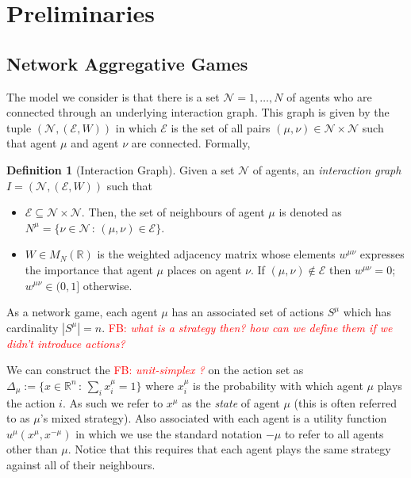 \documentclass{article}
\theoremstyle{definition}
\newtheorem*{definition}{Definition}
\newcommand{\fb}[1]{\textcolor{red}{FB: \textit{#1}}}
\newcommand{\agentset}{\mathcal{N}}
\newcommand{\edgeset}{\mathcal{E}}
\newcommand{\weightset}{W}
\newcommand{\actionset}[1]{S^{#1}}
\newcommand{\wmunu}{w^{\mu \nu}}
\newcommand{\xmu}{x^{\mu}}
\newcommand{\xnotmu}{x^{-\mu}}
\newcommand{\xmuaction}[1]{x^{\mu}_{#1}}
\begin{document}
		\section{Preliminaries}
	\subsection{Network Aggregative Games}
	\label{sec::NAG}

	The model we consider is that there is a set $\agentset = {1,
         \ldots , N}$ of agents who are connected through an underlying
        interaction graph. This graph is given by the tuple
        $(\agentset, (\edgeset, \weightset))$ in which $\edgeset$ is
        the set of all pairs $(\mu, \nu) \in \agentset \times
        \agentset$ such that agent $\mu$ and agent $\nu$ are
        connected. Formally,
        
          \begin{definition}[Interaction Graph]
  Given a set $\agentset$ of agents, an {\em interaction graph} $I = (\agentset, (\edgeset, \weightset))$ such that
  \begin{itemize}
  \item $\edgeset \subseteq \agentset \times \agentset$.        Then, the set of neighbours of agent $\mu$ is
        denoted as $N^\mu = \{\nu \in \agentset \, : \, (\mu, \nu) \in
        \edgeset\}$.
    \item $\weightset \in M_N(\mathbb{R})$ is the weighted
        adjacency matrix whose elements $w^{\mu \nu}$ expresses the
        importance that agent $\mu$ places on agent $\nu$. If $(\mu, \nu) \not \in \edgeset$ then $w^{\mu \nu} = 0$;        $\wmunu \in (0, 1]$ otherwise.
  \end{itemize}
\end{definition}


	As a network game, each agent $\mu$ has an associated set of
        actions $\actionset{\mu}$ which has cardinality
        $|\actionset{\mu}| = n$. \fb{what is a strategy then? how can
          we define them if we didn't introduce actions?}


        We can construct the \fb{unit-simplex ?} on the action
        set as $\Delta_\mu := \{x \in \mathbb{R}^n \, : \, \sum_i
        \xmuaction{i} = 1\}$ where $\xmuaction{i}$ is the probability
        with which agent $\mu$ plays the action $i$. As such we
        refer to $\xmu$ as the \emph{state} of agent $\mu$ (this is
        often referred to as $\mu$'s mixed strategy). Also associated
        with each agent is a utility function $u^\mu(\xmu, \xnotmu)$
        in which we use the standard notation $-\mu$ to refer to all
        agents other than $\mu$. Notice that this requires that each
        agent plays the same strategy against all of their neighbours.
\end{document}
